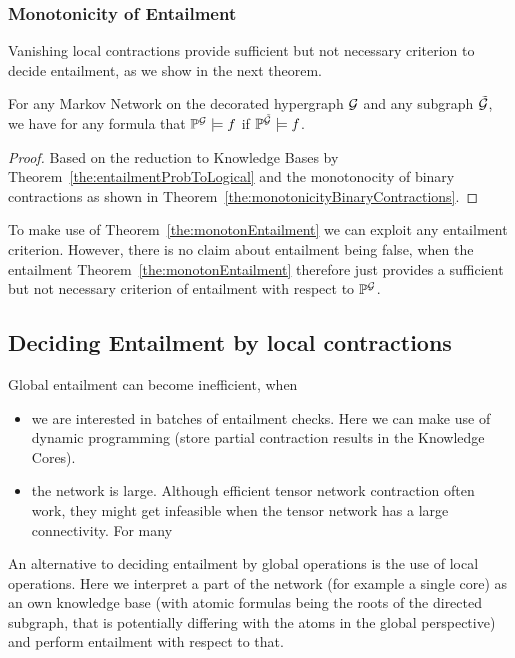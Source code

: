 \subsubsection{Monotonicity of Entailment}


Vanishing local contractions provide sufficient but not necessary criterion to decide entailment, as we show in the next theorem.

\begin{theorem}\label{the:monotonEntailment}
	For any Markov Network on the decorated hypergraph $\mathcal{G}$ and any subgraph $\tilde{\mathcal{G}}$, we have for any formula that $\mathbb{P}^{\mathcal{G}}\models f$ if $\mathbb{P}^{\tilde{\mathcal{G}}}\models f$.
\end{theorem}	
\begin{proof}
	Based on the reduction to Knowledge Bases by Theorem~\ref{the:entailmentProbToLogical} and the monotonocity of binary contractions as shown in Theorem~\ref{the:monotonicityBinaryContractions}.
\end{proof}



\begin{remark}
	To make use of Theorem~\ref{the:monotonEntailment} we can exploit any entailment criterion.
	However, there is no claim about entailment being false, when the entailment 
	Theorem~\ref{the:monotonEntailment} therefore just provides a sufficient but not necessary criterion of entailment with respect to $\mathbb{P}^{\mathcal{G}}$.
\end{remark}



\subsection{Deciding Entailment by local contractions}\label{subsec:LocalEntailment}


Global entailment can become inefficient, when
\begin{itemize}
	\item we are interested in batches of entailment checks. Here we can make use of dynamic programming (store partial contraction results in the Knowledge Cores).
	\item the network is large. Although efficient tensor network contraction often work, they might get infeasible when the tensor network has a large connectivity. For many 
\end{itemize}
An alternative to deciding entailment by global operations is the use of local operations.
Here we interpret a part of the network (for example a single core) as an own knowledge base (with atomic formulas being the roots of the directed subgraph, that is potentially differing with the atoms in the global perspective) and perform entailment with respect to that.

